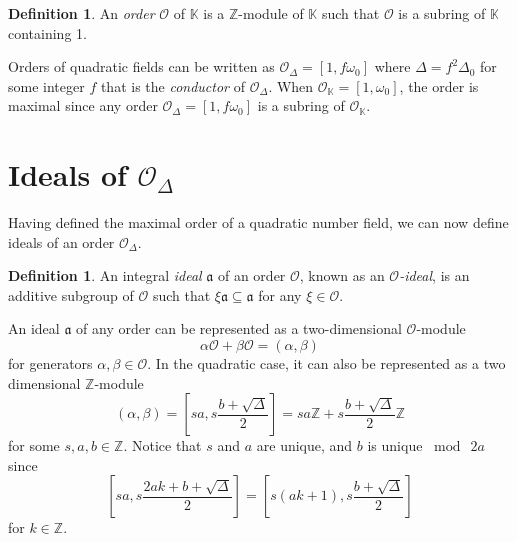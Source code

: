 \documentclass{ucalgthes1}
\theoremstyle{plain}
\theoremstyle{definition}
\newtheorem{defn}[thm]{Definition}
\newcommand{\KK}{\mathbb{K}}
\newcommand{\OO}{\mathcal{O}}
\newcommand{\ZZ}{\mathbb{Z}}
\begin{document}
\begin{defn}
An \emph{order} $\OO$ of $\KK$ is a $\ZZ$-module of $\KK$ such that $\OO$ is a subring of $\KK$ containing 1.
\end{defn}

\noindent
Orders of quadratic fields can be written as  $\OO_\Delta = [1, f\omega_0]$ where $\Delta = f^2\Delta_0$ for  some integer $f$ that is the \emph{conductor} of $\OO_\Delta$.  When $\OO_\KK = [1, \omega_0]$, the order is maximal since any order $\OO_\Delta = [1, f\omega_0]$ is a subring of $\OO_\KK$. 


\bigbreak
\section{Ideals of $\OO_\Delta$}

Having defined the maximal order of a quadratic number field, we can now define ideals of an order $\OO_\Delta$.

\begin{defn}
An integral \emph{ideal} $\mathfrak{a}$ of an order $\OO$, known as an \emph{$\OO$-ideal}, is an additive subgroup of $\OO$ such that $\xi \mathfrak{a} \subseteq \mathfrak{a}$ for any $\xi \in \OO$.
\end{defn}

\noindent
An ideal $\mathfrak{a}$ of any order can be represented as a two-dimensional $\OO$-module
\[
	\alpha \OO + \beta \OO = (\alpha, \beta)
\]
for generators $\alpha, \beta \in \OO$.  In the quadratic case, it can also be represented as a two dimensional $\ZZ$-module
\begin{equation}
\label{eq:idealZModule}
	(\alpha, \beta) = \left[sa, s \frac{b+ \sqrt{\Delta}}{2} \right] = sa \ZZ + s\frac{b + \sqrt{\Delta}}{2} \ZZ
\end{equation}
for some $s, a, b \in \ZZ$.  Notice that $s$ and $a$ are unique, and $b$ is unique $\bmod~2a$ since
\begin{equation*}
	\left[sa, s\frac{2ak+b+\sqrt{\Delta}}{2}\right] = \left[s(ak+1), s\frac{b+\sqrt{\Delta}}{2}\right]
\end{equation*}
for $k \in \ZZ$.
\end{document}
